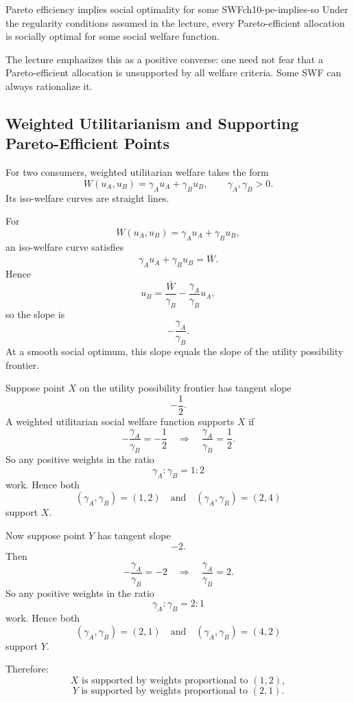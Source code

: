 \begin{theorem}{Pareto efficiency implies social optimality for some SWF}{ch10-pe-implies-so}
Under the regularity conditions assumed in the lecture, every Pareto-efficient allocation is socially optimal for some social welfare function.
\end{theorem}

The lecture emphasizes this as a positive converse: one need not fear that a Pareto-efficient allocation is unsupported by all welfare criteria. Some SWF can always rationalize it.

\subsection{Weighted Utilitarianism and Supporting Pareto-Efficient Points}

For two consumers, weighted utilitarian welfare takes the form
\[
W(u_A,u_B)=\gamma_A u_A + \gamma_B u_B,
\qquad
\gamma_A,\gamma_B>0.
\]
Its iso-welfare curves are straight lines.

\begin{keyformula}[title={Key Formula: Iso-Welfare Slope under Weighted Utilitarianism}]
For
\[
W(u_A,u_B)=\gamma_A u_A+\gamma_B u_B,
\]
an iso-welfare curve satisfies
\[
\gamma_A u_A+\gamma_B u_B=\bar W.
\]
Hence
\[
u_B=\frac{\bar W}{\gamma_B}-\frac{\gamma_A}{\gamma_B}u_A,
\]
so the slope is
\[
-\frac{\gamma_A}{\gamma_B}.
\]
At a smooth social optimum, this slope equals the slope of the utility possibility frontier.
\end{keyformula}

\begin{examplebox}[title={Worked Example: Which weights support a given social optimum?}]
Suppose point $X$ on the utility possibility frontier has tangent slope
\[
-\frac{1}{2}.
\]
A weighted utilitarian social welfare function supports $X$ if
\[
-\frac{\gamma_A}{\gamma_B}=-\frac12
\quad \Longrightarrow \quad
\frac{\gamma_A}{\gamma_B}=\frac12.
\]
So any positive weights in the ratio
\[
\gamma_A:\gamma_B=1:2
\]
work. Hence both
\[
(\gamma_A,\gamma_B)=(1,2)
\quad \text{and} \quad
(\gamma_A,\gamma_B)=(2,4)
\]
support $X$.

Now suppose point $Y$ has tangent slope
\[
-2.
\]
Then
\[
-\frac{\gamma_A}{\gamma_B}=-2
\quad \Longrightarrow \quad
\frac{\gamma_A}{\gamma_B}=2.
\]
So any positive weights in the ratio
\[
\gamma_A:\gamma_B=2:1
\]
work. Hence both
\[
(\gamma_A,\gamma_B)=(2,1)
\quad \text{and} \quad
(\gamma_A,\gamma_B)=(4,2)
\]
support $Y$.

Therefore:
\[
\boxed{X \text{ is supported by weights proportional to } (1,2),}
\]
\[
\boxed{Y \text{ is supported by weights proportional to } (2,1).}
\]
\end{examplebox}

